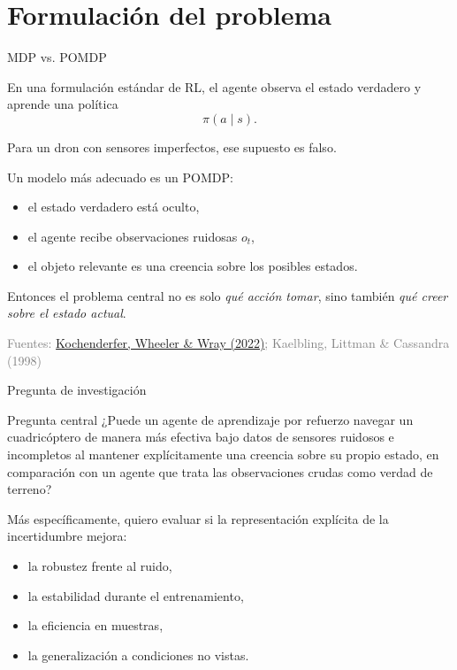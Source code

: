 \documentclass[11pt]{beamer}
\newcommand{\srcKochenderferADM}{\href{https://algorithmsbook.com}{Kochenderfer, Wheeler \& Wray (2022)}}
\newcommand{\srcKaelbling}{Kaelbling, Littman \& Cassandra (1998)}
\newcommand{\SourceLine}[1]{\vfill{\tiny\textcolor{gray}{Fuentes: #1}}}
\begin{document}

\section{Formulación del problema}


\begin{frame}{MDP vs. POMDP}

En una formulación estándar de RL, el agente observa el estado verdadero y aprende una política
\[
\pi(a \mid s).
\]

Para un dron con sensores imperfectos, ese supuesto es falso.

\medskip
Un modelo más adecuado es un POMDP:
\begin{itemize}
  \item el estado verdadero está oculto,
  \item el agente recibe observaciones ruidosas $o_t$,
  \item el objeto relevante es una creencia sobre los posibles estados.
\end{itemize}

\medskip
Entonces el problema central no es solo \emph{qué acción tomar}, sino también \emph{qué creer sobre el estado actual}.

\SourceLine{\srcKochenderferADM; \srcKaelbling}
\end{frame}


\begin{frame}{Pregunta de investigación}

\begin{block}{Pregunta central}
¿Puede un agente de aprendizaje por refuerzo navegar un cuadricóptero de manera más efectiva bajo datos de sensores ruidosos e incompletos al mantener explícitamente una creencia sobre su propio estado, en comparación con un agente que trata las observaciones crudas como verdad de terreno?
\end{block}

\medskip
Más específicamente, quiero evaluar si la representación explícita de la incertidumbre mejora:
\begin{itemize}
  \item la robustez frente al ruido,
  \item la estabilidad durante el entrenamiento,
  \item la eficiencia en muestras,
  \item la generalización a condiciones no vistas.
\end{itemize}
\end{frame}
\end{document}
